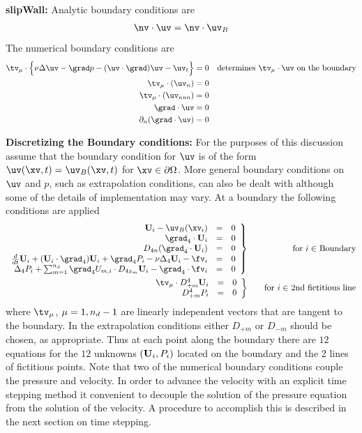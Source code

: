 \documentclass[10pt]{article}
\begin{document}
{\bf slipWall:}
Analytic boundary conditions are
\begin{align*}
   \nv\cdot\uv  = \nv\cdot\uv_B 
\end{align*}
The numerical boundary conditions are
\begin{align*}
    \tv_\mu\cdot\Big\{ \nu\Delta\uv -\grad p - (\uv\cdot\grad)\uv -\uv_t \Big\} & = 0 
                \quad\mbox{determines $\tv_\mu\cdot\uv$ on the boundary} \\  
   \tv_\mu\cdot( \uv_n ) &= 0\\
   \tv_\mu\cdot( \uv_{nnn} ) &= 0\\
   \grad\cdot\uv &= 0 \\
   \partial_n(\grad\cdot\uv) &= 0 \\
\end{align*}




{\bf Discretizing the Boundary conditions:}
For the purposes of this discussion assume that the boundary condition
for $\uv$ is of the form $\uv(\xv,t)=\uv_B(\xv,t)$ for
$\xv\in\partial\Omega$.  More general boundary conditions on $\uv$ and
$p$, such as extrapolation conditions, can also be dealt with although
some of the details of implementation may vary.
\def\ib {n_{m,a}}
At a boundary the following conditions are applied
\begin{eqnarray*}
   \left. \begin{array}{rcl}
 \uvd_{\id}  -\uv_B(\xv_\id) &=& 0  \\
 \grad_4 \cdot \uvd_{\id}  &=& 0    \\
 D_{4n} ( \grad_4\cdot \uvd_{\id} ) &=& 0  \\
 {d\over dt} \uvd_{\id}
 + (\uvd_{\id}\cdot\grad_4) \uvd_{\id}
  +\grad_4 \pd_{\id}  -\nu\Delta_4 \uvd_{\id}-\fv_{\id}  &=& 0   \\
\Delta_4\pd_{\id} + \PF - \grad_4 \cdot \fv_{\id}   &=& 0
   \end{array} \right\}
     &&~~~\mbox{for $\id\in$ Boundary}                  \\
   \left. \begin{array}{rcl}
  \tv_\mu\cdot \Extrap  \uvd_{\id}     &=& 0  \\
   \Extrap \pd_\id                      &=& 0
   \end{array} \right\}
       &&~~~\mbox{for $\id\in$ 2nd fictitious line}
\end{eqnarray*}
where $\tv_\mu$, $\mu=1,n_d-1$ are linearly independent
vectors that are tangent to the boundary. In the extrapolation conditions
either $D_{+m}$ or $D_{-m}$ should be chosen, as appropriate.
Thus at each point along the boundary
there are $12$ equations for the $12$
unknowns $(\mathbf{U}_{i},{ P}_{i})$ located on the boundary
and the 2 lines of fictitious points.
Note that two of the numerical boundary conditions couple the pressure
and velocity.  In order to advance the velocity with an explicit time
stepping method it convenient to decouple the solution of the pressure
equation from the solution of the velocity.  A procedure to accomplish
this is described in the next section on time stepping.
\end{document}
